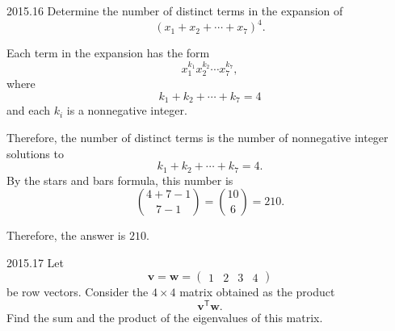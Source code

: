     \begin{pastproblem}{2015.16}
        Determine the number of distinct terms in the expansion of
        \[
            (x_1+x_2+\cdots+x_7)^4.
        \]
    \end{pastproblem}

    \begin{solution}
        Each term in the expansion has the form
        \[
            x_1^{k_1}x_2^{k_2}\cdots x_7^{k_7},
        \]
        where
        \[
            k_1+k_2+\cdots+k_7=4
        \]
        and each $k_i$ is a nonnegative integer.

        Therefore, the number of distinct terms is the number of nonnegative integer solutions to
        \[
            k_1+k_2+\cdots+k_7=4.
        \]
        By the stars and bars formula, this number is
        \[
            \binom{4+7-1}{7-1}
            =
            \binom{10}{6}
            =
            210.
        \]

        Therefore, the answer is $\boxed{210}$.
    \end{solution}

    \begin{pastproblem}{2015.17}
        Let
        \[
            \mathbf{v}=\mathbf{w}=
            \begin{pmatrix}
                1 & 2 & 3 & 4
            \end{pmatrix}
        \]
        be row vectors. Consider the $4\times 4$ matrix obtained as the product
        \[
            \mathbf{v}^{\mathsf T}\mathbf{w}.
        \]
        Find the sum and the product of the eigenvalues of this matrix.
    \end{pastproblem}

